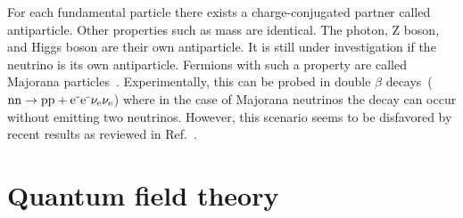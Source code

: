 
For each fundamental particle there exists a charge-conjugated partner called antiparticle. Other properties such as mass are identical. The photon, Z boson, and Higgs boson are their own antiparticle. It is still under investigation if the neutrino is its own antiparticle. Fermions with such a property are called Majorana particles~\cite{Majorana2006}. Experimentally, this can be probed in double $\beta$ decays~($\mathrm{nn}\to\mathrm{pp}+\mathrm{e}^{\rmminus}\mathrm{e}^{\rmminus}\nu_\mathrm{e}\nu_\mathrm{e}$) where in the case of Majorana neutrinos the decay can occur without emitting two neutrinos. However, this scenario seems to be disfavored by recent results as reviewed in Ref.~\cite{Dell'Oro:2016dbc}.


\section{Quantum field theory}

